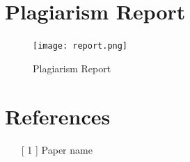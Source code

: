 \documentclass[oneside,a4paper,12pt, times]{book}
\begin{document}
\begin{appendices}
\\
\\

\chapter{Plagiarism Report}

\begin{figure}[h]
    \centering
    \texttt{[image: report.png]} 
    \caption{Plagiarism Report}
    \label{fig:my_label}
\end{figure}
    


\end{appendices}

\chapter{References}
\begin{enumerate}
\item [[ 1]] Paper name\\

\end{enumerate}
\end{document}
